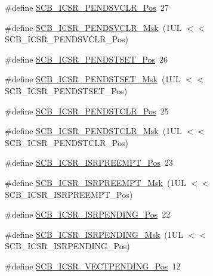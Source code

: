 \begin{DoxyCompactItemize}
\item 
\#define \hyperlink{group___c_m_s_i_s___s_c_b_gae218d9022288f89faf57187c4d542ecd}{S\+C\+B\+\_\+\+I\+C\+S\+R\+\_\+\+P\+E\+N\+D\+S\+V\+C\+L\+R\+\_\+\+Pos}~27
\item 
\#define \hyperlink{group___c_m_s_i_s___s_c_b_ga4a901ace381d3c1c74ac82b22fae2e1e}{S\+C\+B\+\_\+\+I\+C\+S\+R\+\_\+\+P\+E\+N\+D\+S\+V\+C\+L\+R\+\_\+\+Msk}~(1\+U\+L $<$$<$ S\+C\+B\+\_\+\+I\+C\+S\+R\+\_\+\+P\+E\+N\+D\+S\+V\+C\+L\+R\+\_\+\+Pos)
\item 
\#define \hyperlink{group___c_m_s_i_s___s_c_b_ga9dbb3358c6167c9c3f85661b90fb2794}{S\+C\+B\+\_\+\+I\+C\+S\+R\+\_\+\+P\+E\+N\+D\+S\+T\+S\+E\+T\+\_\+\+Pos}~26
\item 
\#define \hyperlink{group___c_m_s_i_s___s_c_b_ga7325b61ea0ec323ef2d5c893b112e546}{S\+C\+B\+\_\+\+I\+C\+S\+R\+\_\+\+P\+E\+N\+D\+S\+T\+S\+E\+T\+\_\+\+Msk}~(1\+U\+L $<$$<$ S\+C\+B\+\_\+\+I\+C\+S\+R\+\_\+\+P\+E\+N\+D\+S\+T\+S\+E\+T\+\_\+\+Pos)
\item 
\#define \hyperlink{group___c_m_s_i_s___s_c_b_gadbe25e4b333ece1341beb1a740168fdc}{S\+C\+B\+\_\+\+I\+C\+S\+R\+\_\+\+P\+E\+N\+D\+S\+T\+C\+L\+R\+\_\+\+Pos}~25
\item 
\#define \hyperlink{group___c_m_s_i_s___s_c_b_gab241827d2a793269d8cd99b9b28c2157}{S\+C\+B\+\_\+\+I\+C\+S\+R\+\_\+\+P\+E\+N\+D\+S\+T\+C\+L\+R\+\_\+\+Msk}~(1\+U\+L $<$$<$ S\+C\+B\+\_\+\+I\+C\+S\+R\+\_\+\+P\+E\+N\+D\+S\+T\+C\+L\+R\+\_\+\+Pos)
\item 
\#define \hyperlink{group___c_m_s_i_s___s_c_b_ga11cb5b1f9ce167b81f31787a77e575df}{S\+C\+B\+\_\+\+I\+C\+S\+R\+\_\+\+I\+S\+R\+P\+R\+E\+E\+M\+P\+T\+\_\+\+Pos}~23
\item 
\#define \hyperlink{group___c_m_s_i_s___s_c_b_gaa966600396290808d596fe96e92ca2b5}{S\+C\+B\+\_\+\+I\+C\+S\+R\+\_\+\+I\+S\+R\+P\+R\+E\+E\+M\+P\+T\+\_\+\+Msk}~(1\+U\+L $<$$<$ S\+C\+B\+\_\+\+I\+C\+S\+R\+\_\+\+I\+S\+R\+P\+R\+E\+E\+M\+P\+T\+\_\+\+Pos)
\item 
\#define \hyperlink{group___c_m_s_i_s___s_c_b_ga10749d92b9b744094b845c2eb46d4319}{S\+C\+B\+\_\+\+I\+C\+S\+R\+\_\+\+I\+S\+R\+P\+E\+N\+D\+I\+N\+G\+\_\+\+Pos}~22
\item 
\#define \hyperlink{group___c_m_s_i_s___s_c_b_ga056d74fd538e5d36d3be1f28d399c877}{S\+C\+B\+\_\+\+I\+C\+S\+R\+\_\+\+I\+S\+R\+P\+E\+N\+D\+I\+N\+G\+\_\+\+Msk}~(1\+U\+L $<$$<$ S\+C\+B\+\_\+\+I\+C\+S\+R\+\_\+\+I\+S\+R\+P\+E\+N\+D\+I\+N\+G\+\_\+\+Pos)
\item 
\#define \hyperlink{group___c_m_s_i_s___s_c_b_gada60c92bf88d6fd21a8f49efa4a127b8}{S\+C\+B\+\_\+\+I\+C\+S\+R\+\_\+\+V\+E\+C\+T\+P\+E\+N\+D\+I\+N\+G\+\_\+\+Pos}~12
$$
\end{DoxyCompactItemize}
